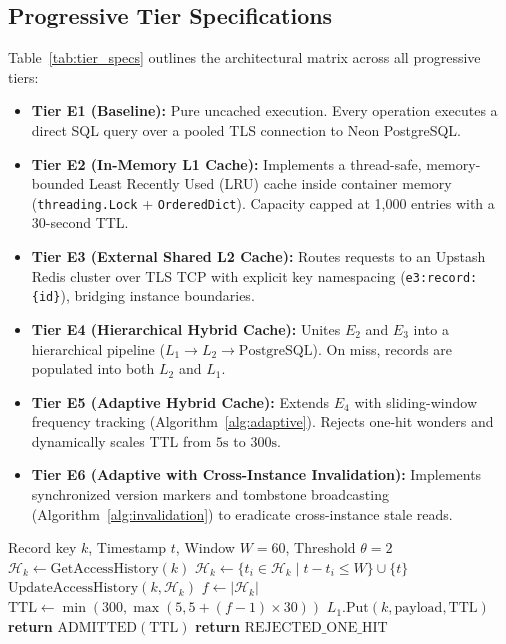 \documentclass[conference]{IEEEtran}
\begin{document}
\subsection{Progressive Tier Specifications}
Table~\ref{tab:tier_specs} outlines the architectural matrix across all progressive tiers:
\begin{itemize}
    \item \textbf{Tier E1 (Baseline):} Pure uncached execution. Every operation executes a direct SQL query over a pooled TLS connection to Neon PostgreSQL.
    \item \textbf{Tier E2 (In-Memory L1 Cache):} Implements a thread-safe, memory-bounded Least Recently Used (LRU) cache inside container memory (\texttt{threading.Lock} + \texttt{OrderedDict}). Capacity capped at 1,000 entries with a 30-second TTL.
    \item \textbf{Tier E3 (External Shared L2 Cache):} Routes requests to an Upstash Redis cluster over TLS TCP with explicit key namespacing (\texttt{e3:record:\{id\}}), bridging instance boundaries.
    \item \textbf{Tier E4 (Hierarchical Hybrid Cache):} Unites $E_2$ and $E_3$ into a hierarchical pipeline ($L_1 \rightarrow L_2 \rightarrow \text{PostgreSQL}$). On miss, records are populated into both $L_2$ and $L_1$.
    \item \textbf{Tier E5 (Adaptive Hybrid Cache):} Extends $E_4$ with sliding-window frequency tracking (Algorithm~\ref{alg:adaptive}). Rejects one-hit wonders and dynamically scales TTL from $5\text{s}$ to $300\text{s}$.
    \item \textbf{Tier E6 (Adaptive with Cross-Instance Invalidation):} Implements synchronized version markers and tombstone broadcasting (Algorithm~\ref{alg:invalidation}) to eradicate cross-instance stale reads.
\end{itemize}

\begin{algorithm}[t]
\caption{Adaptive Cache Admission and Dynamic TTL (Tier $E_5$)}
\label{alg:adaptive}
\begin{algorithmic}[1]
\REQUIRE Record key $k$, Timestamp $t$, Window $W=60$, Threshold $\theta=2$
\STATE $\mathcal{H}_k \leftarrow \text{GetAccessHistory}(k)$
\STATE $\mathcal{H}_k \leftarrow \{t_i \in \mathcal{H}_k \mid t - t_i \le W\} \cup \{t\}$
\STATE $\text{UpdateAccessHistory}(k, \mathcal{H}_k)$
\STATE $f \leftarrow |\mathcal{H}_k|$
    \STATE $\text{TTL} \leftarrow \min(300, \max(5, 5 + (f - 1) \times 30))$
    \STATE $L_1.\text{Put}(k, \text{payload}, \text{TTL})$
    \STATE \textbf{return} $\text{ADMITTED}(\text{TTL})$
\ELSE
    \STATE \textbf{return} $\text{REJECTED\_ONE\_HIT}$
\ENDIF
\end{algorithmic}
\end{algorithm}
\end{document}
